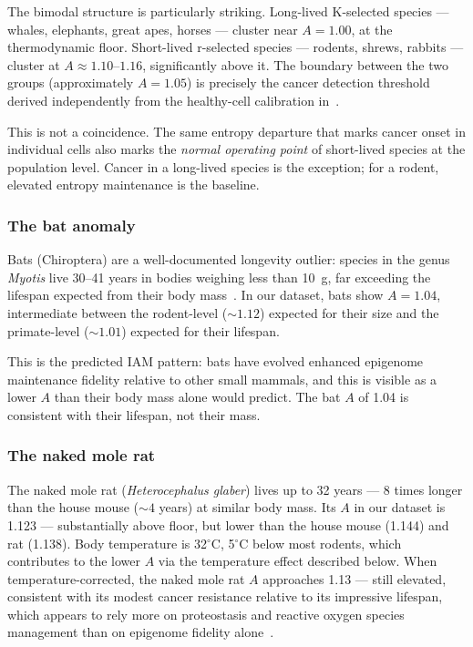 \documentclass[11pt,a4paper]{article}
\newcommand{\Ascore}{A}
\begin{document}
The bimodal structure is particularly striking. Long-lived K-selected species
--- whales, elephants, great apes, horses --- cluster near $\Ascore = 1.00$,
at the thermodynamic floor. Short-lived r-selected species --- rodents, shrews,
rabbits --- cluster at $\Ascore \approx 1.10$--$1.16$, significantly above it.
The boundary between the two groups (approximately $\Ascore = 1.05$) is
precisely the cancer detection threshold derived independently from the
healthy-cell calibration in~\citet{Mahaffey2026}.

This is not a coincidence. The same entropy departure that marks cancer onset
in individual cells also marks the \emph{normal operating point} of short-lived
species at the population level. Cancer in a long-lived species is the exception;
for a rodent, elevated entropy maintenance is the baseline.

\subsubsection{The bat anomaly}

Bats (Chiroptera) are a well-documented longevity outlier: species in the genus
\emph{Myotis} live 30--41 years in bodies weighing less than 10~g, far exceeding
the lifespan expected from their body mass~\citep{Wilkinson2021}.
In our dataset, bats show $\Ascore = 1.04$, intermediate between the
rodent-level ($\sim 1.12$) expected for their size and the primate-level
($\sim 1.01$) expected for their lifespan.

This is the predicted IAM pattern: bats have evolved enhanced epigenome
maintenance fidelity relative to other small mammals, and this is visible
as a lower $\Ascore$ than their body mass alone would predict.
The bat $\Ascore$ of 1.04 is consistent with their lifespan, not their mass.

\subsubsection{The naked mole rat}

The naked mole rat (\emph{Heterocephalus glaber}) lives up to 32 years --- 8 times
longer than the house mouse ($\sim 4$ years) at similar body mass. Its $\Ascore$
in our dataset is 1.123 --- substantially above floor, but lower than the house
mouse (1.144) and rat (1.138). Body temperature is 32$^\circ$C, 5$^\circ$C below
most rodents, which contributes to the lower $\Ascore$ via the temperature effect
described below. When temperature-corrected, the naked mole rat $\Ascore$
approaches 1.13 --- still elevated, consistent with its modest cancer resistance
relative to its impressive lifespan, which appears to rely more on proteostasis
and reactive oxygen species management than on epigenome fidelity alone~\citep{Ruby2018}.
\end{document}
